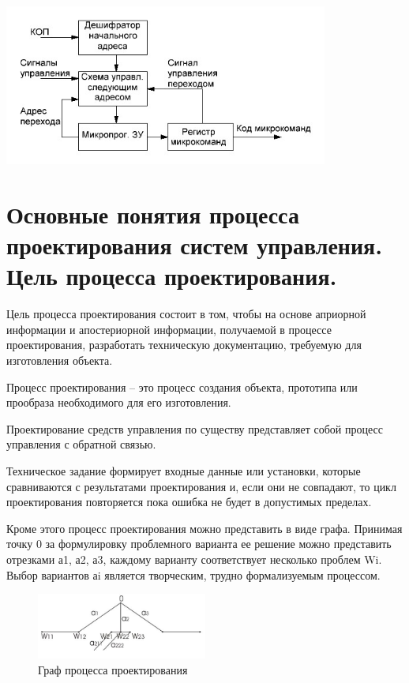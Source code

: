 \documentclass[unicode, 12pt, a4paper, oneside]{article}
\begin{document}
\begin{center}
\includegraphics[width=0.8\textwidth]{120_microprog.png}
\end{center}

\section{Основные понятия процесса проектирования систем управления. Цель процесса проектирования.}

Цель процесса проектирования состоит в том, чтобы на основе априорной информации и апостериорной информации, получаемой в процессе проектирования, разработать техническую документацию, требуемую для изготовления объекта.

Процесс проектирования – это процесс создания объекта, прототипа или прообраза необходимого для его изготовления. 

Проектирование средств управления по существу представляет собой процесс управления с обратной связью.

Техническое задание формирует входные данные или установки, которые сравниваются с результатами проектирования и, если они не совпадают, то цикл проектирования повторяется пока ошибка не будет в допустимых пределах.

Кроме этого процесс проектирования можно представить в виде графа. Принимая точку 0 за формулировку проблемного варианта ее решение можно представить отрезками а1, а2, а3, каждому варианту соответствует несколько проблем Wi.
Выбор вариантов аi является творческим, трудно формализуемым процессом.

\begin{figure}[H]
\centering
\includegraphics[width=0.5\textwidth]{121.jpg}
\caption{Граф процесса проектирования}
\end{figure}
\end{document}
